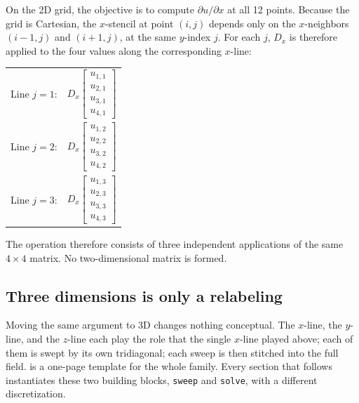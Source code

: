 \documentclass[11pt]{article}
\newcommand{\Dx}{D_{x}}
\begin{document}
On the 2D grid, the objective is to compute $\partial u / \partial x$
at all 12 points.  Because the grid is Cartesian, the $x$-stencil at
point $(i,j)$ depends only on the $x$-neighbors $(i-1,j)$ and
$(i+1,j)$, at the same $y$-index $j$.  For each $j$, $\Dx$ is therefore
applied to the four values along the corresponding $x$-line:

\medskip
\begin{tabular}{ll}
  Line $j=1$: & $\Dx\begin{bmatrix} u_{1,1} \\ u_{2,1} \\ u_{3,1} \\ u_{4,1} \end{bmatrix}$ \\[12pt]
  Line $j=2$: & $\Dx\begin{bmatrix} u_{1,2} \\ u_{2,2} \\ u_{3,2} \\ u_{4,2} \end{bmatrix}$ \\[12pt]
  Line $j=3$: & $\Dx\begin{bmatrix} u_{1,3} \\ u_{2,3} \\ u_{3,3} \\ u_{4,3} \end{bmatrix}$
\end{tabular}
\medskip

The operation therefore consists of three independent applications of
the same $4 \times 4$ matrix.  No two-dimensional matrix is formed.

\subsection{Three dimensions is only a relabeling}
\label{sec:pseudocode}

Moving the same argument to 3D changes nothing conceptual.  The
$x$-line, the $y$-line, and the $z$-line each play the role that the
single $x$-line played above; each of them is swept by its own
tridiagonal; each sweep is then stitched into the full field.
 is a one-page template for the whole family.
Every section that follows instantiates these two building blocks,
\texttt{sweep} and \texttt{solve}, with a different discretization.
\end{document}

